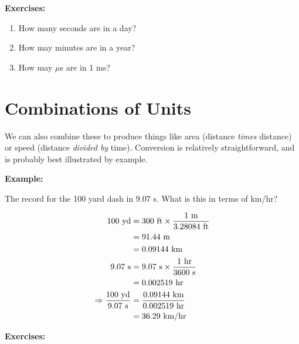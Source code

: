 \documentclass[12pt, letterpaper]{article}
\begin{document}

\textbf{Exercises:}

\begin{enumerate}
\item How many seconds are in a day?

\answergrid{5cm}

\item How may minutes are in a year?

\answergrid{5cm}

\item How may $\mu$s are in 1 ms?

\answergrid{5cm}
\end{enumerate}


\section{Combinations of Units}
We can also combine these to produce things like area (distance \emph{times} distance) or speed (distance \emph{divided by} time).
Conversion is relatively straightforward, and is probably best illustrated by example.

\textbf{Example:}

The record for the 100 yard dash in 9.07 s. 
What is this in terms of km/hr?

\begin{centering}
	
\begin{align}
	100 \textrm{ yd} &= 300 \textrm{ ft} \times \frac{1 \textrm{ m}}{3.28084 \textrm{ ft}}\\
	&= 91.44 \textrm{ m}\\
	&= 0.09144 \textrm{ km}\\
	9.07 \textrm{ s} &= 9.07 \textrm{ s} \times \frac{1 \textrm{ hr}}{3600 \textrm{ s}}\\
	&= 0.002519 \textrm{ hr}\\
	\Rightarrow \frac{100 \textrm{ yd}}{9.07 \textrm{ s}} &= \frac{0.09144 \textrm{ km}}{0.002519 \textrm{ hr}}\\
	&= 36.29 \textrm{ km/hr}
\end{align}

\end{centering}

\clearpage

\textbf{Exercises:}
\end{document}
